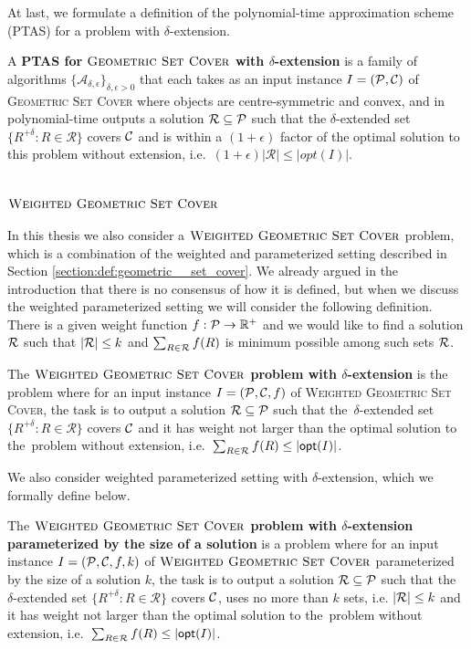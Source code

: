 At last, we formulate a definition of the
polynomial-time approximation scheme (PTAS)
for a problem with $\delta$-extension.

\begin{defi}
A \textbf{PTAS for $\textsc{Geometric Set Cover}$
with $\delta$-extension} is a family of algorithms
$\{\mathcal{A}_{\delta, \epsilon}\}_{\delta, \epsilon > 0}$ that
each takes as an input instance $I=(\mathcal{P}, \mathcal{C})$
of \textsc{Geometric Set} \textsc{Cover} where objects are centre-symmetric and convex,
and in polynomial-time outputs a solution $\mathcal{R} \subseteq \mathcal{P}$
such that the $\delta$-extended set
$\{ R^{+\delta} :  R \in \mathcal{R} \}$ covers $\mathcal{C}$
and is within a $(1+\epsilon)$ factor of the optimal
solution to this problem without
extension, i.e.~$(1+\epsilon)|\mathcal{R}| \le |opt(I)|$.
\end{defi}

\section{$\textsc{Weighted Geometric Set Cover}$}

In this thesis we also consider a $\textsc{Weighted Geometric Set Cover}$ problem,
which is a combination
of the weighted and parameterized setting described in 
Section \ref{section:def:geometric__set_cover}.
We already argued in the introduction
that there is no consensus of how it is defined, but when we discuss the
weighted parameterized setting we will consider the following
definition. There is a given weight function
$f : \mathcal{P} \rightarrow \mathbb{R^+}$
and we would like to find a solution $\mathcal{R}$
such that $|\mathcal{R}| \le k$
and $\sum_{R \in \mathcal{R}} f(R)$ is minimum possible among such sets $\mathcal{R}$.

\begin{defi}
The \textbf{$\textsc{Weighted Geometric Set Cover}$ problem
with $\delta$-extension} is the problem where for an input instance
$I=(\mathcal{P}, \mathcal{C}, f)$ of \textsc{Weighted Geometric Set} \textsc{Cover},
the task is to output a solution $\mathcal{R} \subseteq \mathcal{P}$
such that the~$\delta$-extended set
$\{ R^{+\delta} :  R \in \mathcal{R} \}$ covers $\mathcal{C}$
and it has weight not larger than the optimal solution to the~problem without
extension, i.e.~$\sum_{R \in \mathcal{R}} f(R) \le |\mathsf{opt}(I)|$.
\end{defi}

We also consider weighted parameterized setting with $\delta$-extension,
which we formally define below.

\begin{defi}
The \textbf{$\textsc{Weighted Geometric Set Cover}$ problem
with $\delta$-extension parameterized by the size of a solution}
is a problem where for an input instance
${I=(\mathcal{P}, \mathcal{C}, f, k)}$ of $\textsc{Weighted Geometric Set Cover}$
parameterized by the size of a solution $k$,
the task is to output a solution $\mathcal{R} \subseteq \mathcal{P}$
such that the~$\delta$-extended set
$\{ R^{+\delta} :  R \in \mathcal{R} \}$ covers $\mathcal{C}$,
uses no more than $k$ sets, i.e. $|\mathcal{R}| \le k$
and it has weight not larger than the optimal solution to the~problem without
extension, i.e.~$\sum_{R \in \mathcal{R}} f(R) \le |\mathsf{opt}(I)|$.
\end{defi}

